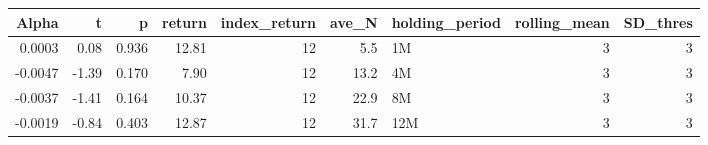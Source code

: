 \begin{table}[ht]
\centering
\begin{tabular}{rrrrrrlrr}
  \hline
Alpha & t & p & return & index\_return & ave\_N & holding\_period & rolling\_mean & SD\_thres \\ 
  \hline
0.0003 & 0.08 & 0.936 & 12.81 & 12 & 5.5 & 1M &  3 &  3 \\ 
  -0.0047 & -1.39 & 0.170 & 7.90 & 12 & 13.2 & 4M &  3 &  3 \\ 
  -0.0037 & -1.41 & 0.164 & 10.37 & 12 & 22.9 & 8M &  3 &  3 \\ 
  -0.0019 & -0.84 & 0.403 & 12.87 & 12 & 31.7 & 12M &  3 &  3 \\ 
   \hline
\end{tabular}
\end{table}

